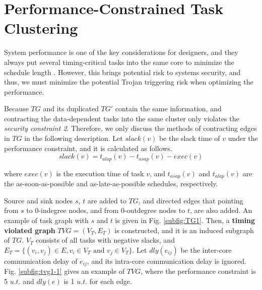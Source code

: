 \documentclass[conference]{IEEEtran}
\begin{document}








\section{Performance-Constrained Task Clustering}

System performance is one of the key considerations for designers, and they always put several timing-critical tasks into the same core to minimize the schedule length \cite{article:CL}. However, this brings potential risk to systems security, and thus, we must minimize the potential Trojan triggering risk when optimizing the performance.%

Because $TG$ and its duplicated $TG'$ contain the same information, and contracting the data-dependent tasks into the same cluster only violates the \textit{security constraint 2}. Therefore, we only discuss the methods of contracting edges in $TG$ in the following description. Let $slack(v)$ be the slack time of $v$ under the performance constraint, and it is calculated as follows.
\begin{equation}
slack(v) = t_{alap}(v)-t_{asap}(v)-exec(v)
\end{equation}

\noindent where $exec(v)$ is the execution time of task $v$, and $t_{asap}(v)$ and $t_{alap}(v)$ are the as-soon-as-possible and as-late-as-possible schedules, respectively.%

Source and sink nodes $s$, $t$ are added to $TG$, and directed edges that pointing from $s$ to 0-indegree nodes, and from 0-outdegree nodes to $t$, are also added. An example of task graph with $s$ and $t$ is given in Fig. \ref{subfig:TG1}. Then, a \textbf{timing violated graph} $TVG=(V_T, E_T)$ is constructed, and it is an induced subgraph of $TG$. $V_T$ consists of all tasks with negative slacks, and $E_T=\{(v_i,v_j)\in E, v_i\in V_T \textrm{~and~} v_j\in V_T\}$. Let $dly(e_{ij})$ be the inter-core communication delay of $e_{ij}$, and its intra-core communication delay is ignored. Fig. \ref{subfig:tvg1-1} gives an example of $TVG$, where the performance constraint is 5 $u.t.$ and $dly(e)$ is 1 $u.t.$ for each edge.
\end{document}
